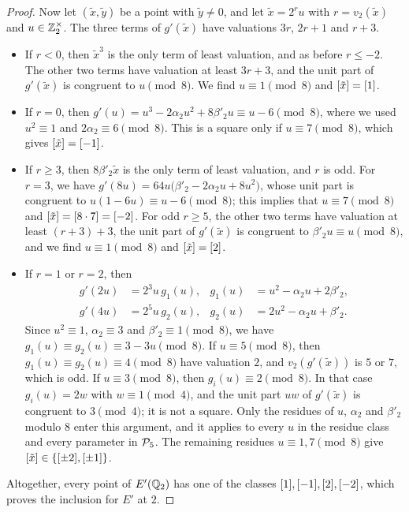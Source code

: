 \begin{proof}
Now let $(\tilde x,\tilde y)$ be a point with $\tilde y\ne0$, and let $\tilde x=2^ru$ with $r=v_2(\tilde x)$ and $u\in\mathbb Z_2^\times$. The three terms of $g'(\tilde x)$ have valuations $3r$, $2r+1$ and $r+3$.
\begin{itemize}
\item If $r<0$, then $\tilde x^3$ is the only term of least valuation, and as before $r\le-2$. The other two terms have valuation at least $3r+3$, and the unit part of $g'(\tilde x)$ is congruent to $u\pmod8$. We find $u\equiv1\pmod8$ and $[\tilde x]=[1]$.
\item If $r=0$, then $g'(u)=u^3-2\alpha_2 u^2+8\beta'_2 u\equiv u-6\pmod 8$, where we used $u^2\equiv1$ and $2\alpha_2\equiv6\pmod8$. This is a square only if $u\equiv7\pmod8$, which gives $[\tilde x]=[-1]$.
\item If $r\ge3$, then $8\beta'_2 \tilde x$ is the only term of least valuation, and $r$ is odd. For $r=3$, we have $g'(8u)=64u\big(\beta'_2-2\alpha_2 u+8u^2\big)$, whose unit part is congruent to $u(1-6u)\equiv u-6\pmod8$; this implies that $u\equiv7\pmod8$ and $[\tilde x]=[8\cdot7]=[-2]$. For odd $r\ge5$, the other two terms have valuation at least $(r+3)+3$, the unit part of $g'(\tilde x)$ is congruent to $\beta'_2 u\equiv u\pmod8$, and we find $u\equiv1\pmod8$ and $[\tilde x]=[2]$.
\item If $r=1$ or $r=2$, then
\[
\begin{aligned}
g'(2u)&=2^3u\,g_1(u),& g_1(u)&=u^2-\alpha_2 u+2\beta'_2,\\
g'(4u)&=2^5u\,g_2(u),& g_2(u)&=2u^2-\alpha_2 u+\beta'_2.
\end{aligned}
\]
Since $u^2\equiv1$, $\alpha_2\equiv3$ and $\beta'_2\equiv1\pmod8$, we have $g_1(u)\equiv g_2(u)\equiv3-3u\pmod8$. If $u\equiv5\pmod8$, then $g_1(u)\equiv g_2(u)\equiv4\pmod8$ have valuation $2$, and $v_2(g'(\tilde x))$ is $5$ or $7$, which is odd. If $u\equiv3\pmod8$, then $g_i(u)\equiv2\pmod8$. In that case $g_i(u)=2w$ with $w\equiv1\pmod4$, and the unit part $uw$ of $g'(\tilde x)$ is congruent to $3\pmod4$; it is not a square. Only the residues of $u$, $\alpha_2$ and $\beta'_2$ modulo $8$ enter this argument, and it applies to every $u$ in the residue class and every parameter in $\mathcal P_5$. The remaining residues $u\equiv1,7\pmod8$ give $[\tilde x]\in\{[\pm2],[\pm1]\}$.
\end{itemize}
Altogether, every point of $E'(\mathbb Q_2)$ has one of the classes $[1],[-1],[2],[-2]$, which proves the inclusion for $E'$ at $2$.


\end{proof}
